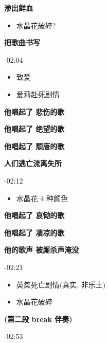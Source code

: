 \documentclass[a4paper]{article}
\begin{document}
\textbf{渗出鲜血}

\begin{itemize}
    \item 水晶花破碎?
\end{itemize}

\textbf{把歌曲书写}

-02:04

\begin{itemize}
    \item 致爱
    \item 爱莉赴死剧情
\end{itemize}

\textbf{他唱起了 悲伤的歌}

\textbf{他唱起了 绝望的歌}

\textbf{他唱起了 颓唐的歌}

\textbf{人们逃亡流离失所}

-02:12

\begin{itemize}
    \item 水晶花 4 种颜色
\end{itemize}

\textbf{他唱起了 哀恸的歌}

\textbf{他唱起了 凄凉的歌}

\textbf{他的歌声 被厮杀声淹没}

-02:21

\begin{itemize}
    \item 英桀死亡剧情(真实, 非乐土)
    \item 水晶花破碎
\end{itemize}

\textbf{(第二段 break 伴奏)}

-02:53
\end{document}
